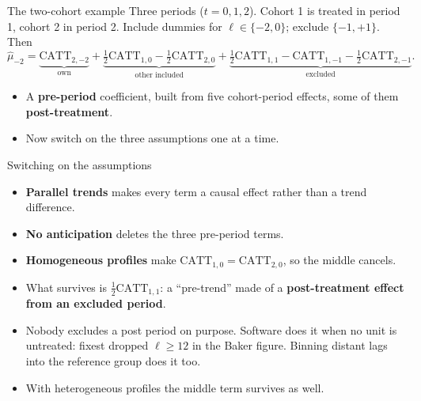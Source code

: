 \documentclass[
  11pt,
  ignorenonframetext,
  aspectratio=169,
]{beamer}
\providecommand{\tightlist}{%
  \setlength{\itemsep}{0pt}\setlength{\parskip}{0pt}}
\begin{document}
\begin{frame}{The two-cohort example}
\protect{}\label{the-two-cohort-example}
Three periods (\(t = 0, 1, 2\)). Cohort 1 is treated in period 1, cohort
2 in period 2. Include dummies for \(\ell \in \{-2, 0\}\); exclude
\(\{-1, +1\}\). Then \[
\hat\mu_{-2} = \underbrace{\text{CATT}_{2,-2}}_{\text{own}} + \underbrace{\tfrac12\text{CATT}_{1,0} - \tfrac12\text{CATT}_{2,0}}_{\text{other included}} + \underbrace{\tfrac12\text{CATT}_{1,1} - \text{CATT}_{1,-1} - \tfrac12\text{CATT}_{2,-1}}_{\text{excluded}}.
\]

\begin{itemize}
\tightlist
\item
  A \textbf{pre-period} coefficient, built from five cohort-period
  effects, some of them \textbf{post-treatment}.
\item
  Now switch on the three assumptions one at a time.
\end{itemize}
\end{frame}

\begin{frame}{Switching on the assumptions}
\protect{}\label{switching-on-the-assumptions}
\begin{itemize}
\tightlist
\item
  \textbf{Parallel trends} makes every term a causal effect rather than
  a trend difference.
\item
  \textbf{No anticipation} deletes the three pre-period terms.
\item
  \textbf{Homogeneous profiles} make
  \(\text{CATT}_{1,0} = \text{CATT}_{2,0}\), so the middle cancels.
\end{itemize}

\vspace{0.4em}

\begin{itemize}
\tightlist
\item
  What survives is \(\tfrac12\text{CATT}_{1,1}\): a ``pre-trend'' made
  of a \textbf{post-treatment effect from an excluded period}.
\item
  Nobody excludes a post period on purpose. Software does it when no
  unit is untreated: fixest dropped \(\ell \ge 12\) in the Baker figure.
  Binning distant lags into the reference group does it too.
\item
  With heterogeneous profiles the middle term survives as well.
\end{itemize}
\end{frame}
\end{document}
